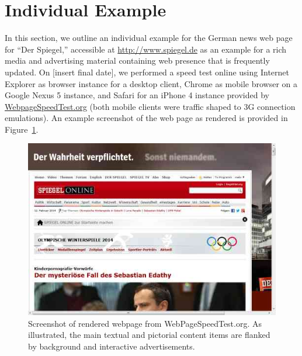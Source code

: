 \documentclass[letterpaper,conference]{IEEEtran}
\begin{document}
\section{Individual Example}
In this section, we outline an individual example for the German news web page for ``Der Spiegel,'' accessible at \url{http://www.spiegel.de} as an example for a rich media and advertising material containing web presence that is frequently updated.
On [insert final date], we performed a speed test online using Internet Explorer as browser instance for a desktop client, Chrome as mobile browser on a Google Nexus 5 instance, and Safari for an iPhone 4 instance provided by \url{WebpageSpeedTest.org} (both mobile clients were traffic shaped to 3G connection emulations).
An example screenshot of the web page as rendered is provided in Figure~\ref{fig:screens}.
\begin{figure}
	\centering
	\includegraphics[width=.9\linewidth]{1screen}
	\caption{Screenshot of rendered webpage from WebPageSpeedTest.org. As illustrated, the main textual and pictorial content items are flanked by background and interactive advertisements.}
	\label{fig:screens}
\end{figure}
\end{document}
